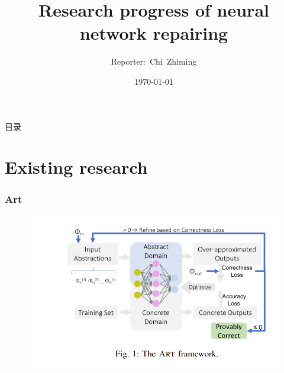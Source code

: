 \documentclass[aspectratio=169%
,serif,mathserif]{beamer}
\begin{document}
\title{Research progress of neural network repairing} %
\author[Chi~Zhiming]{Reporter:~Chi~Zhiming} %
\institute[ISCAS] %
{	
}

	\CTEXoptions[today=old]
	\date{\today} %
\begin{frame}[plain]\vspace{1.5em}
\titlepage\vspace{-0.5cm}
\end{frame}
\begin{frame}{目录}
\tableofcontents
\end{frame}

\section{Existing research} %
\begin{frame}
	\frametitle{Art}
	\begin{figure}[htbp]
		\includegraphics[width=.7\linewidth]{1.png}
	\end{figure}
\end{frame}
\end{document}
